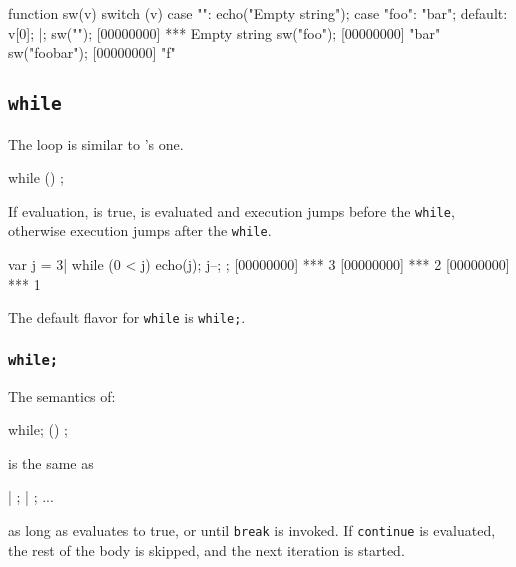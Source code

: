 \begin{urbiscript}
function sw(v)
{
  switch (v)
  {
    case "":
      echo("Empty string");
    case "foo":
      "bar";
    default:
      v[0];
  }
}|;
sw("");
[00000000] *** Empty string
sw("foo");
[00000000] "bar"
sw("foobar");
[00000000] "f"
\end{urbiscript}

\subsection{\lstinline{while}}
\label{sec:lang:while}



The  loop is similar to \langC's one.

\begin{urbiunchecked}
while ()
  ;
\end{urbiunchecked}

If  evaluation, is true,  is evaluated and
execution jumps before the \lstinline{while}, otherwise execution
jumps after the \lstinline{while}.

\begin{urbiscript}
var j = 3|
while (0 < j)
{
  echo(j);
  j--;
};
[00000000] *** 3
[00000000] *** 2
[00000000] *** 1
\end{urbiscript}

The default flavor for \lstinline{while} is \lstinline|while;|.

\subsubsection{\lstinline{while;}}
\label{sec:lang:while:semi}
The semantics of:

\begin{urbiunchecked}
while; ()
  ;
\end{urbiunchecked}

\noindent
is the same as

\begin{urbiunchecked}
 |  ;  |  ; ...
\end{urbiunchecked}

\noindent
as long as  evaluates to true, or until \lstinline{break} is
invoked.  If \lstinline{continue} is evaluated, the rest of the body
is skipped, and the next iteration is started.

